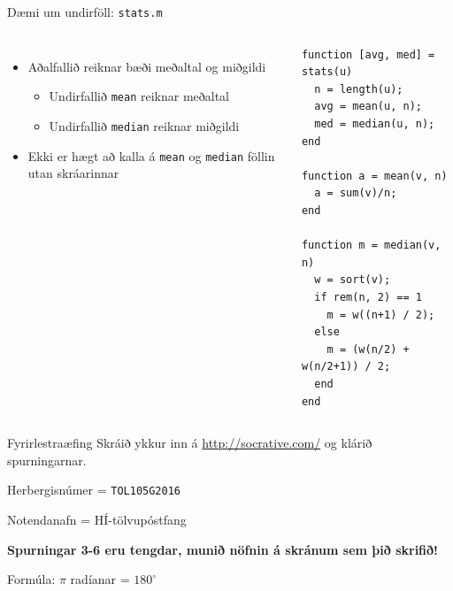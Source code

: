 \documentclass{beamer}
\begin{document}
\begin{frame}[fragile]{Dæmi um undirföll: \texttt{stats.m}}
\begin{columns}
\begin{itemize}
 \item Aðalfallið reiknar bæði meðaltal og miðgildi
 \begin{itemize}
  \item Undirfallið \texttt{mean} reiknar meðaltal
  \item Undirfallið \texttt{median} reiknar miðgildi
 \end{itemize}
 \item Ekki er hægt að kalla á \texttt{mean} og \texttt{median} föllin utan skráarinnar
\end{itemize}

\begin{verbatim}
function [avg, med] = stats(u)
  n = length(u);
  avg = mean(u, n);
  med = median(u, n);
end

function a = mean(v, n)
  a = sum(v)/n;
end

function m = median(v, n)
  w = sort(v);
  if rem(n, 2) == 1
    m = w((n+1) / 2);
  else
    m = (w(n/2) + w(n/2+1)) / 2;
  end
end
\end{verbatim}
\end{columns}
\end{frame}

\begin{frame}[fragile]{Fyrirlestraæfing}
Skráið ykkur inn á \url{http://socrative.com/} og klárið spurningarnar.

Herbergisnúmer = \texttt{TOL105G2016}

Notendanafn = HÍ-tölvupóstfang

\textbf{Spurningar 3-6 eru tengdar, munið nöfnin á skránum sem þið skrifið!}

Formúla: $\pi$ radíanar = $180^\circ$
\end{frame}
\end{document}

